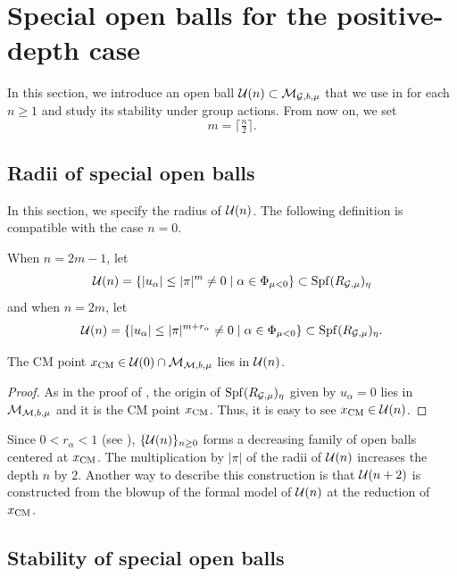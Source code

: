 \documentclass[12pt,reqno]{amsart}
\begin{document}
\section{Special open balls for the positive-depth case} \label{sec:special_open_balls}

In this section, we introduce an open ball ${\mathcal{U}}(n) \subset {\mathcal{M}}_{{\mathcal{G}}, b, \mu}$ that we use in  for each $n \geq 1$ and study its stability under group actions. From now on, we set
\[
    m = \lceil \tfrac{n}{2} \rceil. 
\]

\subsection{Radii of special open balls}

In this section, we specify the radius of ${\mathcal{U}}(n)$. The following definition is compatible with the case $n = 0$. 

\begin{defi} \label{defi:U(n)_radius}
    When $n = 2m - 1$, let
    \[
        {\mathcal{U}}(n) = \{ \lvert u_\alpha \rvert \leq \lvert \pi \rvert^{m} \neq 0 \mid \alpha \in \Phi_{\mu<0}\} \subset {\operatorname{Spf}}(R_{{\mathcal{G}}, \mu})_\eta
    \]
    and when $n = 2m$, let
    \[
        {\mathcal{U}}(n) = \{ \lvert u_\alpha \rvert \leq \lvert \pi \rvert^{m + r_\alpha} \neq 0 \mid \alpha \in \Phi_{\mu<0}\} \subset {\operatorname{Spf}}(R_{{\mathcal{G}}, \mu})_\eta. 
    \]
\end{defi}

\begin{lem}
    The CM point $x_{\operatorname{CM}} \in {\mathcal{U}}(0) \cap {\mathcal{M}}_{{\mathcal{M}}, b, \mu}$ lies in ${\mathcal{U}}(n)$. 
\end{lem}
\begin{proof}
    As in the proof of , the origin of ${\operatorname{Spf}}(R_{{\mathcal{G}}, \mu})_\eta$ given by $u_\alpha = 0$ lies in ${\mathcal{M}}_{{\mathcal{M}}, b, \mu}$ and it is the CM point $x_{\operatorname{CM}}$. Thus, it is easy to see $x_{\operatorname{CM}} \in {\mathcal{U}}(n)$. 
\end{proof}

Since $0 < r_\alpha < 1$ (see ), $\{ {\mathcal{U}}(n) \}_{n \geq 0}$ forms a decreasing family of open balls centered at $x_{\operatorname{CM}}$. The multiplication by $\lvert \pi \rvert$ of the radii of ${\mathcal{U}}(n)$ increases the depth $n$ by $2$. Another way to describe this construction is that ${\mathcal{U}}(n + 2)$ is constructed from the blowup of the formal model of ${\mathcal{U}}(n)$ at the reduction of $x_{\operatorname{CM}}$. 


\subsection{Stability of special open balls} \label{ssec:stabilizer_open_balls}
\end{document}
